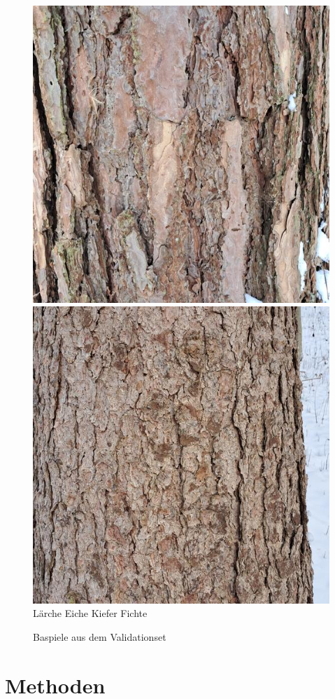 \documentclass{article}
\begin{document}
\begin{figure}[htbp!]
  \includegraphics[width=0.24\linewidth]{examples/validation/Pine}
  \includegraphics[width=0.24\linewidth]{examples/validation/Spruce}
  Lärche \hspace{70pt} Eiche \hspace{70pt} Kiefer \hspace{70pt} Fichte\\
  \caption{Baspiele aus dem Validationset}
  \label{validation}
\end{figure}

\section{Methoden}
\end{document}
